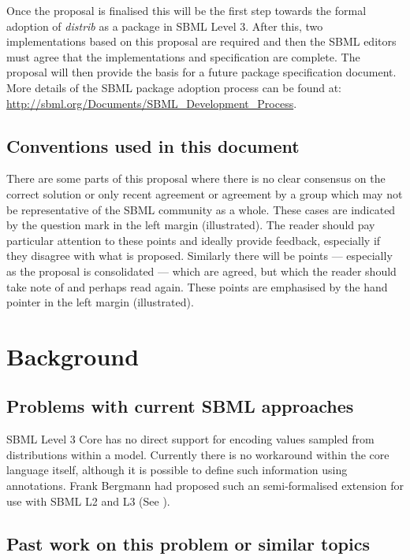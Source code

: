 \documentclass[draftspec]{sbmlpkgspec}
\newcommand{\distribshort}{\emph{distrib}\xspace}
\newcommand{\watchout}{\marginpar{\hspace*{34pt}\raisebox{-0.5ex}{\Large\ding{43}}}}
\newcommand{\controversial}{\marginpar{\hspace*{34pt}\raisebox{-0.5ex}{\Large?}}}
\begin{document}
Once the proposal is finalised this will be the first step towards the
formal adoption of \distribshort as a package in SBML Level
3. After this, two implementations based on this proposal are required
and then the SBML editors must agree that the implementations and specification are complete. The proposal
will then provide the basis for a future package specification
document. More details of the SBML package adoption process can be
found at: \url{http://sbml.org/Documents/SBML_Development_Process}.


\subsection{Conventions used in this document}

There are some
parts of this proposal where there is no clear consensus on the
correct solution or only recent agreement or agreement by a group
which may not be representative of the SBML community as a
whole. These cases are indicated by the \controversial question mark
in the left margin (illustrated). The reader should pay particular
attention to these points and ideally provide feedback, especially if
they disagree with what is proposed. Similarly there will be points
--- especially as the proposal is consolidated --- which are agreed,
but which the reader should take note of and perhaps read again. These
points \watchout are emphasised by the hand pointer in the left margin
(illustrated).

\section{Background}

\subsection{Problems with current SBML approaches}

SBML Level 3 Core has no direct support for encoding values sampled from distributions
within a model. Currently there is no workaround within the core
language itself, although it is possible to define such information
using annotations. Frank Bergmann had proposed such
an semi-formalised extension for use with SBML L2 and L3 (See ).

\subsection{Past work on this problem or similar topics}
\end{document}

